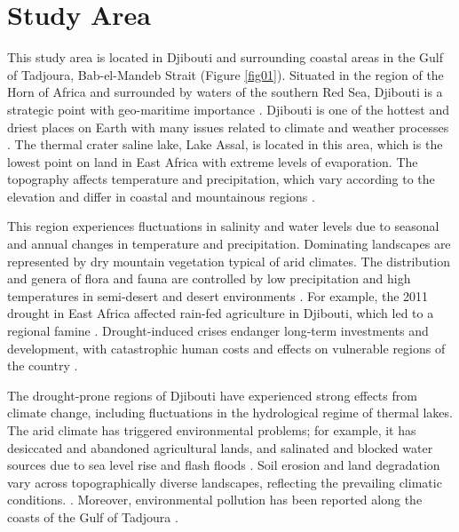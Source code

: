 \documentclass[jimaging,article,accept,pdftex,moreauthors]{Definitions/mdpi}
\begin{document}
\section{Study Area}\label{sec2}

This study area is located in Djibouti and surrounding coastal areas in the Gulf of Tadjoura, Bab-el-Mandeb Strait{ }(Figure \ref{fig01}). Situated in the region of the Horn of Africa and surrounded by waters of the southern Red Sea, Djibouti is a strategic point with geo-maritime importance{ }\cite{McCabe02102019,Lawale02102023}. Djibouti is one of the hottest and driest places on {Earth} with many issues related to climate and weather processes \cite{Verdugo2016}. {The} thermal crater saline lake, Lake Assal, {is located in this area, which is} the lowest point on land in East Africa with extreme levels of evaporation. {The topography affects }temperature and precipitation, {which }vary according to the elevation and differ in coastal and mountainous regions \cite{Haile}. 

This region experiences {fluctuations} in salinity and water levels {due to} seasonal and annual changes in temperature and precipitation. {Dominating landscapes are represented by }dry mountain vegetation {typical of arid climates}. The distribution and genera of flora and fauna are{ }controlled by low precipitation and high temperatures in semi-desert and desert environments \cite{GEBREMESKELHAILE2020135299,Lemenkova202221,AGHAKOUCHAK2015127}. For example, the 2011 drought in East Africa {affected rain-fed agriculture in} Djibouti, {which led to a regional }famine \cite{AGUTU2017287,DERCOLE2024104264,Dinku10112011}. Drought-induced crises endanger long-term investments and development,{ with} catastrophic human costs and effects on vulnerable regions of the country \cite{MISHRA2010202,FAVA202144,BRAVAR1991281}.

The drought-prone regions of{ }Djibouti {have experienced} strong effects from climate change, {including} fluctuations in the hydrological regime of thermal lakes. The arid climate{ has }triggered environmental problems{; for example,} it has desiccated and abandoned{ }agricultural lands, and salinated and blocked water sources due to sea level rise {and} flash floods \cite{Schulman02012019,CARRAO2016108}. Soil erosion and land degradation vary {across} topographically diverse landscapes, {reflecting the prevailing climatic conditions.} %
\cite{FENTA2020135016,Knight2022}. Moreover, environmental pollution has been reported {along the coasts of the} Gulf of Tadjoura \cite{BOLDROCCHI2018812,BOLDROCCHI2018812,GAJDZIK2021112244}. 
\end{document}
